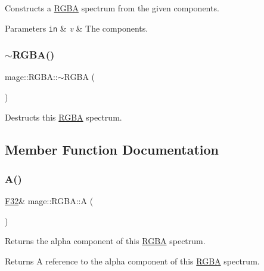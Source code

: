 Constructs a \mbox{\hyperlink{structmage_1_1_r_g_b_a}{R\+G\+BA}} spectrum from the given components.


\begin{DoxyParams}[1]{Parameters}
\mbox{\tt in}  & {\em v} & The components. \\
\hline
\end{DoxyParams}
\mbox{\label{structmage_1_1_r_g_b_a_a139a22381a3fb02d1f28be505b41c9df}} 
\subsubsection{\texorpdfstring{$\sim$\+R\+G\+B\+A()}{~RGBA()}}
{\footnotesize\ttfamily mage\+::\+R\+G\+B\+A\+::$\sim$\+R\+G\+BA (\begin{DoxyParamCaption}{ }\end{DoxyParamCaption})\hspace{0.3cm}{\ttfamily [default]}}

Destructs this \mbox{\hyperlink{structmage_1_1_r_g_b_a}{R\+G\+BA}} spectrum. 

\subsection{Member Function Documentation}
\mbox{\label{structmage_1_1_r_g_b_a_aaf2ebdedafda83a3017bdc15ec13ca51}} 
\subsubsection{\texorpdfstring{A()}{A()}\hspace{0.1cm}{\footnotesize\ttfamily [1/2]}}
{\footnotesize\ttfamily \mbox{\hyperlink{namespacemage_aa97e833b45f06d60a0a9c4fc22ae02c0}{F32}}\& mage\+::\+R\+G\+B\+A\+::A (\begin{DoxyParamCaption}{ }\end{DoxyParamCaption})\hspace{0.3cm}{\ttfamily [noexcept]}}

Returns the alpha component of this \mbox{\hyperlink{structmage_1_1_r_g_b_a}{R\+G\+BA}} spectrum.

\begin{DoxyReturn}{Returns}
A reference to the alpha component of this \mbox{\hyperlink{structmage_1_1_r_g_b_a}{R\+G\+BA}} spectrum. 
\end{DoxyReturn}
\mbox{\label{structmage_1_1_r_g_b_a_ad06902ada26125cd91e4134b80712bd9}} 
